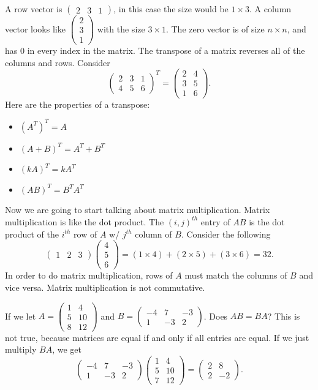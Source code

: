 A row vector is $\begin{pmatrix} 2&3&1 \end{pmatrix} $, in this case the size would be $1\times 3$. A column vector looks like $\begin{pmatrix} 2\\3\\1 \end{pmatrix} $ with the size $3\times 1$. The zero vector is of size $n\times n$, and has $0$ in every index in the matrix. The transpose of a matrix reverses all of the columns and rows. Consider
\[
  \begin{pmatrix} 2&3&1\\4&5&6 \end{pmatrix} ^{T}=\begin{pmatrix} 2&4\\3&5\\1&6 \end{pmatrix} 
.\] 
Here are the properties of a transpose:
\begin{itemize}
  \item $\left( A^{T} \right)^{T}=A $
  \item $\left( A+B \right) ^{T}=A^{T}+B^{T}$
  \item $(kA)^{T}=kA^{T}$
  \item $\left( AB \right) ^{T}=B^{T}A^{T}$
\end{itemize}
Now we are going to start talking about matrix multiplication. Matrix multiplication is like the dot product. The $(i,j)^{th}$ entry of $AB$ is the dot product of the $i^{th}$ row of $A$ w/ $j^{th}$ column of $B$. Consider the following
\[
  \begin{pmatrix} 1&2&3 \end{pmatrix} \begin{pmatrix} 4\\5\\6 \end{pmatrix} =(1\times 4)+(2\times 5)+(3\times 6)= 32
.\] 
In order to do matrix multiplication, rows of $A$ must match the columns of $B$ and vice versa. Matrix multiplication is not commutative. 
\begin{eg}
  If we let $A=\begin{pmatrix} 1&4\\5&10\\8&12 \end{pmatrix}$ and $B=\begin{pmatrix} -4&7&-3\\1&-3&2 \end{pmatrix} $. Does $AB=BA$? This is not true, because matrices are equal if and only if all entries are equal. If we just multiply $BA$, we get \[
  \begin{pmatrix} -4&7&-3\\1&-3&2 \end{pmatrix}\begin{pmatrix} 1&4\\5&10\\7&12 \end{pmatrix}  = \begin{pmatrix}2&8\\2&-2\end{pmatrix} 
  .\] 
\end{eg}
